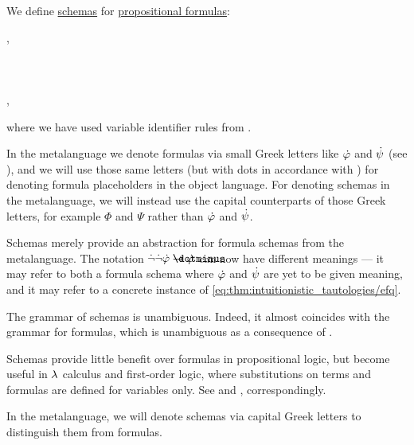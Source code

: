 \begin{definition}\label{def:propositional_formula_schema}\mimprovised
  We define \hyperref[con:schemas_and_instances]{schemas} for \hyperref[def:propositional_formula]{propositional formulas}:
  \begin{bnf*}
     {}, \\
          {\bnftsq{\( \syntop \)} \bnfor \bnftsq{\( \synbot \)} \bnfor} \\
     \\
     \\
    ,
  \end{bnf*}
  where we have used variable identifier rules from .
\end{definition}
\begin{comments}
  \item In the metalanguage we denote formulas via small Greek letters like \( \dot{\varphi} \) and \( \dot{\psi} \) (see ), and we will use those same letters (but with dots in accordance with ) for denoting formula placeholders in the object language. For denoting schemas in the metalanguage, we will instead use the capital counterparts of those Greek letters, for example \( \Phi \) and \( \Psi \) rather than \( \dot{\varphi} \) and \( \dot{\psi} \).
  \item Schemas merely provide an abstraction for formula schemas from the metalanguage. The notation \( \synneg \synneg \syn\varphi \synimplies \syn\varphi \) can now have different meanings --- it may refer to both a formula schema where \( \dot{\varphi} \) and \( \dot{\psi} \) are yet to be given meaning, and it may refer to a concrete instance of \eqref{eq:thm:intuitionistic_tautologies/efq}.
  \item The grammar of schemas is unambiguous. Indeed, it almost coincides with the grammar for formulas, which is unambiguous as a consequence of .
  \item Schemas provide little benefit over formulas in propositional logic, but become useful in \( \mathrm{\lambda} \) calculus and first-order logic, where substitutions on terms and formulas are defined for variables only. See  and , correspondingly.
  \item In the metalanguage, we will denote schemas via capital Greek letters to distinguish them from formulas.
\end{comments}


